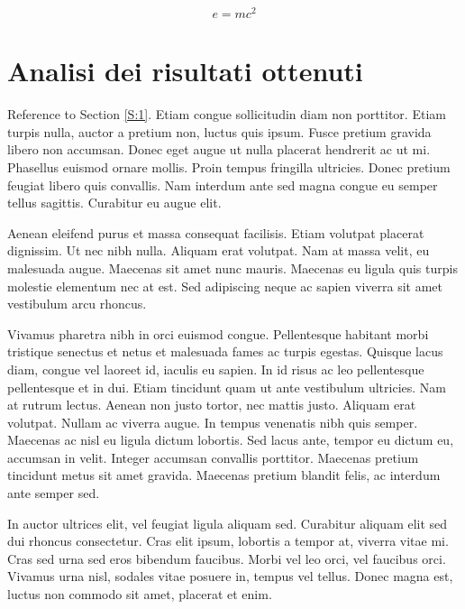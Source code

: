 \documentclass[preprint,12pt]{elsarticle}
\begin{document}
\begin{equation}
\label{eq:emc}
e = mc^2
\end{equation}

\section{Analisi dei risultati ottenuti}
\label{S:2}

Reference to Section \ref{S:1}. Etiam congue sollicitudin diam non porttitor. Etiam turpis nulla, auctor a pretium non, luctus quis ipsum. Fusce pretium gravida libero non accumsan. Donec eget augue ut nulla placerat hendrerit ac ut mi. Phasellus euismod ornare mollis. Proin tempus fringilla ultricies. Donec pretium feugiat libero quis convallis. Nam interdum ante sed magna congue eu semper tellus sagittis. Curabitur eu augue elit.

Aenean eleifend purus et massa consequat facilisis. Etiam volutpat placerat dignissim. Ut nec nibh nulla. Aliquam erat volutpat. Nam at massa velit, eu malesuada augue. Maecenas sit amet nunc mauris. Maecenas eu ligula quis turpis molestie elementum nec at est. Sed adipiscing neque ac sapien viverra sit amet vestibulum arcu rhoncus.

Vivamus pharetra nibh in orci euismod congue. Pellentesque habitant morbi tristique senectus et netus et malesuada fames ac turpis egestas. Quisque lacus diam, congue vel laoreet id, iaculis eu sapien. In id risus ac leo pellentesque pellentesque et in dui. Etiam tincidunt quam ut ante vestibulum ultricies. Nam at rutrum lectus. Aenean non justo tortor, nec mattis justo. Aliquam erat volutpat. Nullam ac viverra augue. In tempus venenatis nibh quis semper. Maecenas ac nisl eu ligula dictum lobortis. Sed lacus ante, tempor eu dictum eu, accumsan in velit. Integer accumsan convallis porttitor. Maecenas pretium tincidunt metus sit amet gravida. Maecenas pretium blandit felis, ac interdum ante semper sed.

In auctor ultrices elit, vel feugiat ligula aliquam sed. Curabitur aliquam elit sed dui rhoncus consectetur. Cras elit ipsum, lobortis a tempor at, viverra vitae mi. Cras sed urna sed eros bibendum faucibus. Morbi vel leo orci, vel faucibus orci. Vivamus urna nisl, sodales vitae posuere in, tempus vel tellus. Donec magna est, luctus non commodo sit amet, placerat et enim.

\end{document}
